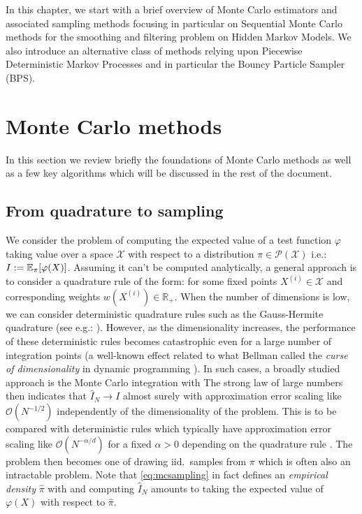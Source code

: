 
In this chapter, we start with a brief overview of Monte Carlo estimators and associated sampling methods focusing in particular on Sequential Monte Carlo methods for the smoothing and filtering problem on Hidden Markov Models. We also introduce an alternative class of methods relying upon Piecewise Deterministic Markov Processes and in particular the Bouncy Particle Sampler (BPS). 

\section{\label{sec:MC+SMC}Monte Carlo methods}
In this section we review briefly the foundations of Monte Carlo methods as well as a few key algorithms which will be discussed in the rest of the document.

\subsection{From quadrature to sampling}
We consider the problem of computing the expected value of a test function $\varphi$ taking value over a space $\mathcal X$ with respect to a distribution $\pi\in\mathcal P(\mathcal X)$ i.e.: $I:=\mathbb E_\pi[\varphi(X)]$. Assuming it can't be computed analytically, a general approach is to consider a quadrature rule of the form:
%
%
for some fixed points $X^{(i)}\in\mathcal X$ and corresponding weights $w(X^{(i)})\in\mathbb R_+$. 
When the number of dimensions is low, we can consider deterministic quadrature rules such as the Gauss-Hermite quadrature (see e.g.: \citet{davis75}). However, as the dimensionality increases, the performance of these deterministic rules becomes catastrophic even for a large number of integration points (a well-known effect related to what Bellman called the \emph{curse of dimensionality} in dynamic programming \citep{bellman57,bengtsson08}). 
In such cases, a broadly studied approach is the Monte Carlo integration with
%
%
The strong law of large numbers then indicates that $\widehat I_N\to I$ almost surely with approximation error scaling like $\mathcal O(N^{-1/2})$ independently of the dimensionality of the problem. This is to be compared with deterministic rules which typically have approximation error scaling like $\mathcal O(N^{-\alpha/d})$ for a fixed $\alpha>0$ depending on the quadrature rule \citep{caflisch98}. The problem then becomes one of drawing iid.\ samples from $\pi$ which is often also an intractable problem. Note that \eqref{eq:mcsampling} in fact defines an \emph{empirical density} $\hat \pi$ with
%
%
and computing $\hat I_{N}$ amounts to taking the expected value of $\varphi(X)$ with respect to $\hat\pi$.

